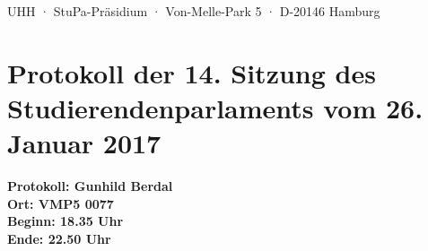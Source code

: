 \documentclass[ngerman,headheight=70pt]{scrartcl}
\begin{document}
    UHH · StuPa-Präsidium · Von-Melle-Park 5 · D-20146 Hamburg

    \section*{Protokoll der 14. Sitzung des Studierendenparlaments vom 26. Januar 2017}

    \textbf{Protokoll: Gunhild Berdal}\\
    \textbf{Ort: VMP5 0077}\\
    \textbf{Beginn: 18.35 Uhr}\\
    \textbf{Ende: 22.50 Uhr}

    \vspace{0.5cm}
\end{document}
